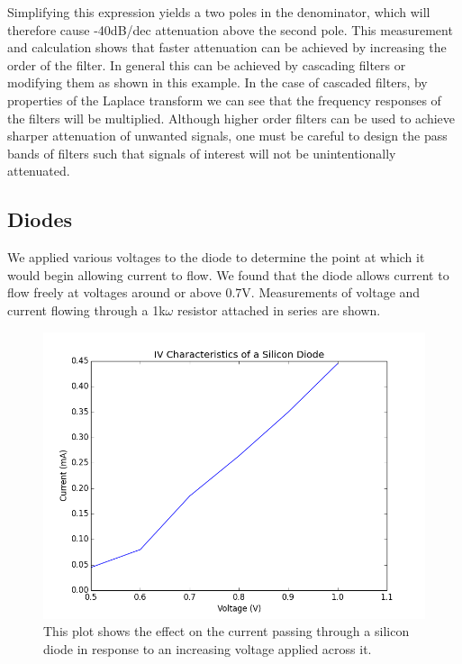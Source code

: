 \documentclass[11pt]{article}
\begin{document}
  Simplifying this expression yields a two poles in the denominator, which will therefore cause -40dB/dec attenuation above the second pole. This measurement and calculation shows that faster attenuation can be achieved by increasing the order of the filter. In general this can be achieved by cascading filters or modifying them as shown in this example.  In the case of cascaded filters, by properties of the Laplace transform we can see that the frequency responses of the filters will be multiplied. Although higher order filters can be used to achieve sharper attenuation of unwanted signals, one must be careful to design the pass bands of filters such that signals of interest will not be unintentionally attenuated. 
  
  \subsection{Diodes}
  We applied various voltages to the diode to determine the point at which it would begin allowing current to flow.  We found that the diode allows current to flow freely at voltages around or above 0.7V.  Measurements of voltage and current flowing through a 1k$\omega$ resistor attached in series are shown.
  
    \begin{figure}[h!]
    \centering
    \includegraphics[scale=0.5]{diode_iv.png}
    \caption{This plot shows the effect on the current passing through a silicon diode in response to an increasing voltage applied across it.}
    \label{fig:diode_iv}
    \end{figure}
    
\end{document}
